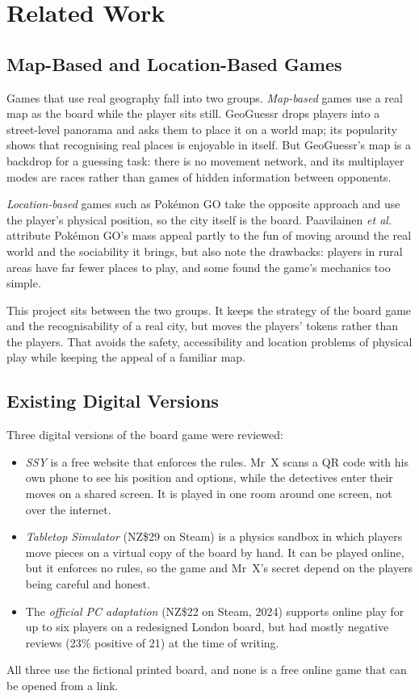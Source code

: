 \documentclass[lettersize,journal]{IEEEtran}
\begin{document}
\section{Related Work}\label{sec:related}

\subsection{Map-Based and Location-Based Games}
Games that use real geography fall into two groups. \emph{Map-based} games use a real map as the board while the player sits still. GeoGuessr \cite{geoguessr} drops players into a street-level panorama and asks them to place it on a world map; its popularity shows that recognising real places is enjoyable in itself. But GeoGuessr's map is a backdrop for a guessing task: there is no movement network, and its multiplayer modes are races rather than games of hidden information between opponents.

\emph{Location-based} games such as Pok\'emon GO \cite{paavilainen2017pokemon} take the opposite approach and use the player's physical position, so the city itself is the board. Paavilainen \emph{et al.} \cite{paavilainen2017pokemon} attribute Pok\'emon GO's mass appeal partly to the fun of moving around the real world and the sociability it brings, but also note the drawbacks: players in rural areas have far fewer places to play, and some found the game's mechanics too simple.

This project sits between the two groups. It keeps the strategy of the board game and the recognisability of a real city, but moves the players' tokens rather than the players. That avoids the safety, accessibility and location problems of physical play while keeping the appeal of a familiar map.

\subsection{Existing Digital Versions}
Three digital versions of the board game were reviewed:
\begin{itemize}
	\item \emph{SSY} \cite{ssy} is a free website that enforces the rules. Mr~X scans a QR code with his own phone to see his position and options, while the detectives enter their moves on a shared screen. It is played in one room around one screen, not over the internet.
	\item \emph{Tabletop Simulator} \cite{tts} (NZ\$29 on Steam) is a physics sandbox in which players move pieces on a virtual copy of the board by hand. It can be played online, but it enforces no rules, so the game and Mr~X's secret depend on the players being careful and honest.
	\item The \emph{official PC adaptation} \cite{official_pc} (NZ\$22 on Steam, 2024) supports online play for up to six players on a redesigned London board, but had mostly negative reviews (23\% positive of 21) at the time of writing.
\end{itemize}
All three use the fictional printed board, and none is a free online game that can be opened from a link.
\end{document}
